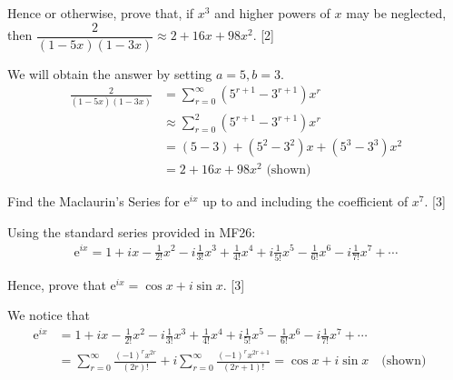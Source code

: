 \documentclass[12pt, a4 paper]{article}
\begin{document}
\begin{outline}[enumerate]
 \2 Hence or otherwise, prove that, if \(x^3\) and higher powers of \(x\) may be neglected, then \(\dfrac{2}{(1-5x)(1-3x)} \approx 2+16x+98x^2\).
 \hfill[2]
 \begin{answer}
  We will obtain the answer by setting \(a=5,b=3\).
  \begin{align*}
   \frac{2}{(1-5x)(1-3x)} & = \sum_{r=0}^{\infty}(5^{r+1}-3^{r+1})x^r  \\
                          & \approx \sum_{r=0}^{2}(5^{r+1}-3^{r+1})x^r \\
                          & = (5-3) + (5^2 - 3^2)x + (5^3 - 3^3)x^2    \\
                          & = 2 + 16x +98x^2 \textrm{ (shown)}
  \end{align*}
 \end{answer}

 \1 Find the Maclaurin's Series for \(\mathrm{e}^{ix}\) up to and including the coefficient of \(x^7\). \hfill[3] %
 \begin{answer}
  Using the standard series provided in MF26:
  \begin{align*}
   \mathrm{e}^{ix} = 1 + ix - \frac{1}{2!}x^2 - i\frac{1}{3!}x^3 + \frac{1}{4!}x^4 + i\frac{1}{5!}x^5 - \frac{1}{6!}x^6 - i\frac{1}{7!}x^7+ \cdots
  \end{align*}
 \end{answer}
 \2 Hence, prove that \(\mathrm{e}^{ix} = \cos x + i\sin x\). \hfill[3]
 \begin{answer}
  We notice that
  \begin{align*}
   \mathrm{e}^{ix} & = 1 + ix - \frac{1}{2!}x^2 - i\frac{1}{3!}x^3 + \frac{1}{4!}x^4 + i\frac{1}{5!}x^5 - \frac{1}{6!}x^6 - i\frac{1}{7!}x^7+ \cdots                            \\
                   & = \sum_{r=0}^{\infty} \frac{{(-1)}^r x^{2r}}{(2r)!} + i\sum_{r=0}^{\infty} \frac{{(-1)}^r x^{2r+1}}{(2r+1)!} = \cos x + i\sin x \quad\textrm{(shown)}\quad
  \end{align*}
 \end{answer}
\end{outline}
\end{document}
